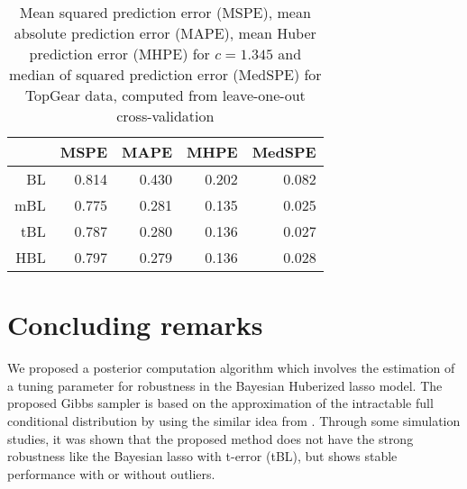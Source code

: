 \documentclass[11pt]{article}
\theoremstyle{plain}
\theoremstyle{definition}
\begin{document}
\begin{table}[ht]
\caption{Mean squared prediction error (MSPE), mean absolute prediction error (MAPE), mean Huber prediction error (MHPE) for $c=1.345$ and median of squared prediction error (MedSPE) for TopGear data, computed from leave-one-out cross-validation}
\begin{center}
\begin{tabular}{rrrrr}
  \hline
 & MSPE & MAPE & MHPE & MedSPE \\ 
  \hline
BL & 0.814 & 0.430 & 0.202 & 0.082 \\ 
  mBL & 0.775 & 0.281 & 0.135 & 0.025 \\ 
  tBL & 0.787 & 0.280 & 0.136 & 0.027 \\ 
  HBL & 0.797 & 0.279 & 0.136 & 0.028 \\ 
   \hline
\end{tabular}
\end{center}
\label{tab:topgear}
\end{table}



\section{Concluding remarks}
\label{sec:6}

We proposed a posterior computation algorithm which involves the estimation of a tuning parameter for robustness in the Bayesian Huberized lasso model. The proposed Gibbs sampler is based on the approximation of the intractable full conditional distribution by using the similar idea from \cite{M19}. Through some simulation studies, it was shown that the proposed method does not have the strong robustness like the Bayesian lasso with t-error (tBL), but shows stable performance with or without outliers.
\end{document}
